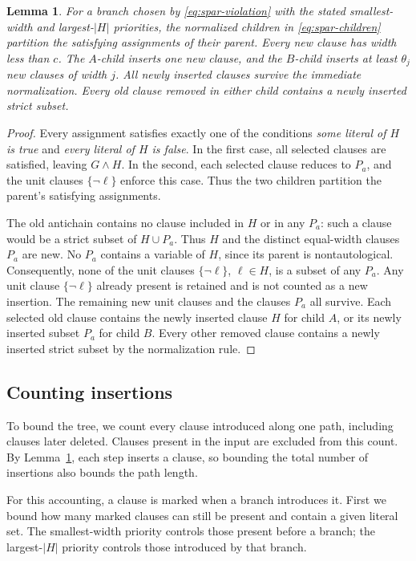 \documentclass[11pt,reqno]{amsart}
\numberwithin{equation}{section}
\newtheorem{lemma}[theorem]{Lemma}
\theoremstyle{definition}\newtheorem{definition}[theorem]{Definition}
\theoremstyle{remark}\newtheorem{remark}[theorem]{Remark}
\begin{document}
\begin{lemma}\label{lem:spar-branch}
For a branch chosen by \eqref{eq:spar-violation} with the stated
smallest-width and largest-$|H|$ priorities, the normalized children
in \eqref{eq:spar-children} partition the satisfying assignments
of their parent. Every new clause has width less than $c$.
The $A$-child inserts one new clause, and the $B$-child inserts at least
$\theta_j$ new clauses of width $j$. All newly inserted clauses survive
the immediate normalization. Every old clause removed in either child
contains a newly inserted strict subset.
\end{lemma}
\begin{proof}
Every assignment satisfies exactly one of the conditions
\emph{some literal of $H$ is true} and
\emph{every literal of $H$ is false}.
In the first case, all selected clauses are satisfied, leaving
$G\wedge H$. In the second, each selected clause reduces to $P_a$,
and the unit clauses $\{\neg\ell\}$ enforce this case.
Thus the two children partition the parent's satisfying assignments.

The old antichain contains no clause included in $H$ or in any $P_a$:
such a clause would be a strict subset of $H\cup P_a$.
Thus $H$ and the distinct equal-width clauses $P_a$ are new.
No $P_a$ contains a variable of $H$, since its parent is nontautological.
Consequently, none of the unit clauses $\{\neg\ell\}$, $\ell\in H$,
is a subset of any $P_a$.
Any unit clause $\{\neg\ell\}$ already present is retained and
is not counted as a new insertion.
The remaining new unit clauses and the clauses $P_a$ all survive.
Each selected old clause contains the newly inserted clause $H$
for child $A$, or its newly inserted subset $P_a$ for child $B$.
Every other removed clause contains a newly inserted strict subset
by the normalization rule.
\end{proof}

\subsection{Counting insertions}
To bound the tree, we count every clause introduced along one path,
including clauses later deleted. Clauses present in the input are
excluded from this count. By Lemma~\ref{lem:spar-branch}, each step
inserts a clause, so bounding the total number of insertions also
bounds the path length.

For this accounting, a clause is marked when a branch introduces it.
First we bound how many
marked clauses can still be present and contain a given literal set.
The smallest-width priority controls those present before a branch;
the largest-$|H|$ priority controls those introduced by that branch.
\end{document}
